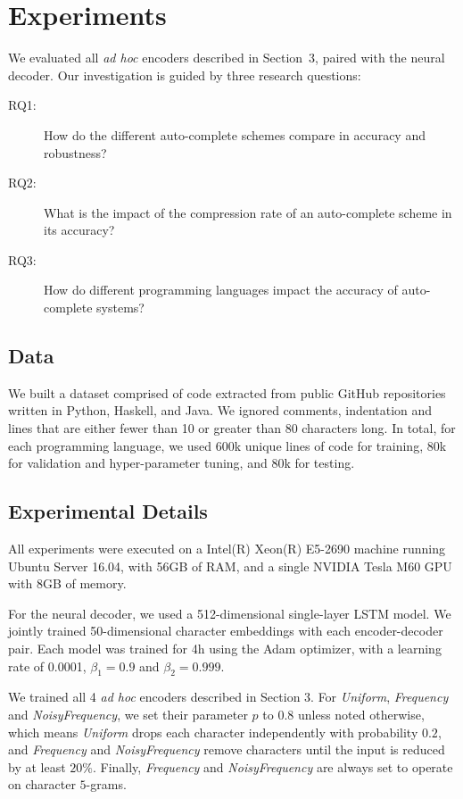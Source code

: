 \documentclass{article}
\begin{document}
\section{Experiments}
\label{sec:experiments}

We evaluated all \emph{ad hoc} encoders described
in Section~3, paired with the neural decoder. Our investigation is guided
by three research questions:

\begin{description}
    \item[RQ1: ] How do the different auto-complete schemes compare in accuracy and robustness?
    \item[RQ2: ] What is the impact of
    the compression rate of an
    auto-complete scheme in its
    accuracy?
    \item[RQ3: ] How do different
    programming languages impact the
    accuracy of auto-complete systems?
\end{description}

\subsection{Data}

We built a dataset comprised of code extracted from public GitHub repositories written in Python, Haskell, and Java.
We ignored comments,
indentation and lines that
are either fewer than 10 or greater than 80 characters long. In total,
for each programming language,
we used 600k unique lines
of code for training,
80k for validation and
hyper-parameter tuning,
and 80k for testing.

\subsection{Experimental Details}

All experiments were executed
on a Intel(R) Xeon(R) E5-2690
machine running
Ubuntu Server 16.04,
with 56GB of RAM,
and a single NVIDIA Tesla M60 GPU
with 8GB of memory.

For the neural decoder, we used
a 512-dimensional single-layer LSTM model. We jointly trained
50-dimensional character
embeddings with each
encoder-decoder pair.
Each model was trained for
4h using the Adam
optimizer, with a learning
rate of 0.0001,
$\beta_1 = 0.9$ and $\beta_2 = 0.999$.

We trained all 4 \emph{ad hoc} encoders described
in Section 3. For \emph{Uniform}, \emph{Frequency} and \emph{NoisyFrequency}, we set their parameter $p$ to $0.8$ unless noted otherwise,
which means \emph{Uniform} drops each character
independently with probability $0.2$, and \emph{Frequency}
and \emph{NoisyFrequency} remove characters until the input
is reduced by at least $20\%$. Finally,
\emph{Frequency} and \emph{NoisyFrequency} are always set to operate on character $5$-grams.
\end{document}
